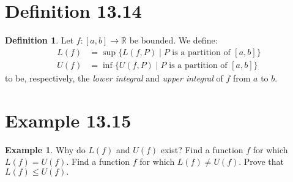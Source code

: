 \documentclass[openany, amssymb, psamsfonts]{amsart}
\newcommand{\bbR}{\mathbb{R}}
\theoremstyle{definition}
\newtheorem{defn}{Definition}[section]
\newtheorem{exmp}{Example}[section]
\numberwithin{equation}{section}
\begin{document}
\section*{Definition 13.14}
\begin{defn}
\label{13.14}
	Let $f\colon [a, b] \to \bbR$ be bounded. We define:
	\begin{align*}
		L(f) & = \sup \{ L(f, P) \mid \text{$P$ is a partition of $[a, b]$} \} \\
		U(f) & = \inf \{ U(f, P) \mid \text{$P$ is a partition of $[a, b]$} \}
	\end{align*}
	to be, respectively, the \emph{lower integral} and \emph{upper integral} of $f$ from $a$ to $b$.
\end{defn}

\section*{Example 13.15}
\begin{exmp}
\label{13.15}
	Why do $L(f)$ and $U(f)$ exist? Find a function $f$ for which $L(f) = U(f)$. Find a function $f$ for which $L(f) \neq U(f)$. Prove that $L(f)\leq U(f).$ 	
\end{exmp}
\end{document}
